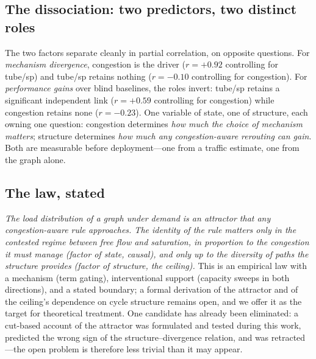 \subsection{The dissociation: two predictors, two distinct roles}
\label{sec:dissociation}

The two factors separate cleanly in partial correlation, on opposite
questions. For \emph{mechanism divergence}, congestion is the driver
($r=+0.92$ controlling for tube/sp) and tube/sp retains nothing ($r=-0.10$
controlling for congestion). For \emph{performance gains} over blind
baselines, the roles invert: tube/sp retains a significant independent link
($r=+0.59$ controlling for congestion) while congestion retains none
($r=-0.23$). One variable of state, one of structure, each owning one
question: congestion determines \emph{how much the choice of mechanism
matters}; structure determines \emph{how much any congestion-aware rerouting
can gain}. Both are measurable before deployment---one from a traffic
estimate, one from the graph alone.

\subsection{The law, stated}

\emph{The load distribution of a graph under demand is an attractor that any
congestion-aware rule approaches. The identity of the rule matters only in the
contested regime between free flow and saturation, in proportion to the
congestion it must manage (factor of state, causal), and only up to the
diversity of paths the structure provides (factor of structure, the ceiling).}
This is an empirical law with a mechanism (term gating), interventional
support (capacity sweeps in both directions), and a stated boundary; a formal
derivation of the attractor and of the ceiling's dependence on cycle structure
remains open, and we offer it as the target for theoretical treatment. One candidate has already been eliminated: a cut-based account of the attractor was formulated and tested during this work, predicted the wrong sign of the structure--divergence relation, and was retracted---the open problem is therefore less trivial than it may appear.

